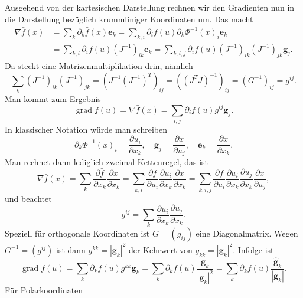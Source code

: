Ausgehend von der kartesischen Darstellung rechnen wir den
Gradienten nun in die Darstellung bezüglich
krummliniger Koordinaten um. Das macht
\begin{align}
\nabla\bar f(x) &= \sum_k\partial_k \bar f(x)\mathbf e_k
= \sum_{k,i}\partial_i f(u)\partial_k\Phi^{-1}(x)_i\mathbf e_k\\
&= \sum_{k,i}\partial_i f(u) (J^{-1})_{ik}\mathbf e_k
= \sum_{k,i,j}\partial_i f(u) (J^{-1})_{ik}(J^{-1})_{jk}\mathbf g_j.
\end{align}
Da steckt eine Matrizenmultiplikation drin, nämlich
\begin{equation}
\sum_{k} (J^{-1})_{ik}(J^{-1})_{jk} = (J^{-1}(J^{-1})^T)_{ij}
= ((J^T J)^{-1})_{ij} = (G^{-1})_{ij} = g^{ij}.
\end{equation}
Man kommt zum Ergebnis
\begin{equation}
\operatorname{grad} f(u) = \nabla\bar f(x)
= \sum_{i,j}\partial_i f(u) g^{ij}\mathbf g_j.
\end{equation}
In klassischer Notation würde man schreiben
\begin{equation}
\partial_k\Phi^{-1}(x)_i = \frac{\partial u_i}{\partial x_k},\quad
\mathbf g_j = \frac{\partial x}{\partial u_j},\quad
\mathbf e_k = \frac{\partial x}{\partial x_k}.
\end{equation}
Man rechnet dann lediglich zweimal Kettenregel, das ist
\begin{equation}
\nabla\bar f(x) = \sum_k\frac{\partial\bar f}{\partial x_k}\frac{\partial x}{\partial x_k}
= \sum_{k,i}\frac{\partial f}{\partial u_i}
\frac{\partial u_i}{\partial x_k}\frac{\partial x}{\partial x_k}
= \sum_{k,i,j}\frac{\partial f}{\partial u_i}\frac{\partial u_i}{\partial x_k}
\frac{\partial u_j}{\partial x_k}\frac{\partial x}{\partial u_j},
\end{equation}
und beachtet
\begin{equation}
g^{ij} = \sum_k\frac{\partial u_i}{\partial x_k}\frac{\partial u_j}{\partial x_k}.
\end{equation}
Speziell für orthogonale Koordinaten ist $G=(g_{ij})$ eine
Diagonalmatrix. Wegen $G^{-1}=(g^{ij})$ ist dann
$g^{kk} = |\mathbf g_k|^2$ der Kehrwert von
$g_{kk} = |\mathbf g_k|^2$. Infolge ist
\begin{equation}
\operatorname{grad} f(u)
= \sum_k\partial_k f(u)g^{kk}\mathbf g_k
= \sum_k\partial_k f(u)\frac{\mathbf g_k}{|\mathbf g_k|^2}
= \sum_k\partial_k f(u)\frac{\mathbf {\hat g}_k}{|\mathbf g_k|}.
\end{equation}
Für Polarkoordinaten
